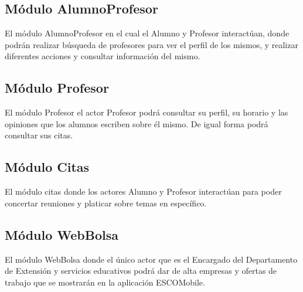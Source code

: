 \pagebreak
\subsection{Módulo AlumnoProfesor}
\noindent
El módulo AlumnoProfesor en el cual el Alumno y Profesor interactúan, donde podrán realizar búsqueda de profesores para ver el perfil de los mismos, y realizar diferentes acciones y consultar información del mismo.

\pagebreak
\subsection{Módulo Profesor}
\noindent
El módulo Profesor el actor Profesor podrá consultar su perfil, su horario y las opiniones que los alumnos escriben sobre él mismo. De igual forma podrá consultar sus citas.



\pagebreak

\subsection{Módulo Citas}
\noindent
El módulo citas donde los actores Alumno y Profesor interactúan para poder concertar reuniones y platicar sobre temas en específico. 



\pagebreak
\subsection{Módulo WebBolsa}
\noindent
El módulo WebBolsa donde el único actor que es el Encargado del Departamento de Extensión y servicios educativos podrá dar de alta empresas y ofertas de trabajo que se mostrarán en la aplicación ESCOMobile.


